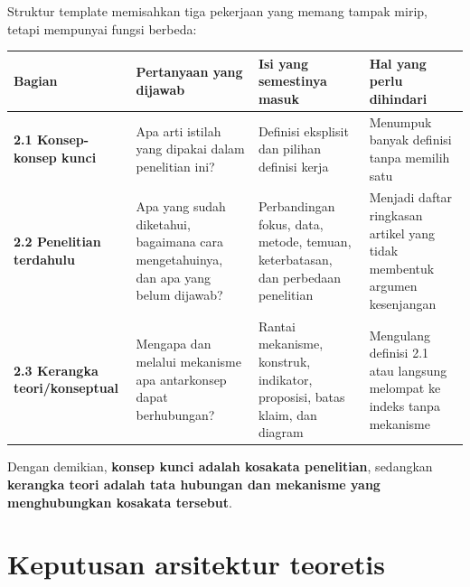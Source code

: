 \documentclass[
  indonesian,
  11pt,
  a4paper,
  oneside,
  openany]{report}
\newcounter{none} %
\begin{document}
Struktur template memisahkan tiga pekerjaan yang memang tampak mirip,
tetapi mempunyai fungsi berbeda:

{\def\LTcaptype{none} %
\begin{longtable}[]{@{}
  >{\raggedright\arraybackslash}p{}
  >{\raggedright\arraybackslash}p{}
  >{\raggedright\arraybackslash}p{}
  >{\raggedright\arraybackslash}p{}@{}}
\toprule\noalign{}
\begin{minipage}[b]{\linewidth}\raggedright
Bagian
\end{minipage} & \begin{minipage}[b]{\linewidth}\raggedright
Pertanyaan yang dijawab
\end{minipage} & \begin{minipage}[b]{\linewidth}\raggedright
Isi yang semestinya masuk
\end{minipage} & \begin{minipage}[b]{\linewidth}\raggedright
Hal yang perlu dihindari
\end{minipage} \\
\midrule\noalign{}
\endhead
\bottomrule\noalign{}
\endlastfoot
\textbf{2.1 Konsep-konsep kunci} & Apa arti istilah yang dipakai dalam
penelitian ini? & Definisi eksplisit dan pilihan definisi kerja &
Menumpuk banyak definisi tanpa memilih satu \\
\textbf{2.2 Penelitian terdahulu} & Apa yang sudah diketahui, bagaimana
cara mengetahuinya, dan apa yang belum dijawab? & Perbandingan fokus,
data, metode, temuan, keterbatasan, dan perbedaan penelitian & Menjadi
daftar ringkasan artikel yang tidak membentuk argumen kesenjangan \\
\textbf{2.3 Kerangka teori/konseptual} & Mengapa dan melalui mekanisme
apa antarkonsep dapat berhubungan? & Rantai mekanisme, konstruk,
indikator, proposisi, batas klaim, dan diagram & Mengulang definisi 2.1
atau langsung melompat ke indeks tanpa mekanisme \\
\end{longtable}
}

Dengan demikian, \textbf{konsep kunci adalah kosakata penelitian},
sedangkan \textbf{kerangka teori adalah tata hubungan dan mekanisme yang
menghubungkan kosakata tersebut}.

\section{Keputusan arsitektur
teoretis}\label{keputusan-arsitektur-teoretis}
\end{document}
